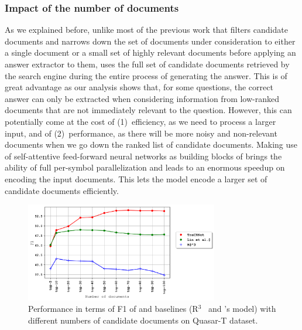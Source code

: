 \subsubsection{Impact of the number of documents}
As we explained before, unlike most of the previous work that filters candidate documents and narrows down the set of documents under consideration to either a single document or a small set of highly relevant documents before applying an answer extractor to them, \tracrnet uses the full set of candidate documents retrieved by the search engine during the entire process of generating the answer. 
This is of great advantage as our analysis shows that, for some questions, the correct answer can only be extracted when considering information from low-ranked documents that are not immediately relevant to the question.
However, this can potentially come at the cost of (1)~efficiency, as we need to process a larger input, and of (2)~performance, as there will be more noisy and non-relevant documents when we go down the ranked list of candidate documents. 
%
Making use of self-attentive feed-forward neural networks as building blocks of \tracrnet brings the ability of full per-symbol parallelization and leads to an enormous speedup on encoding the input documents. This lets the model encode a larger set of candidate documents efficiently. 

\begin{figure}[!t]
 \centering
 \includegraphics[width=0.75\textwidth]{04-part-03/chapter-06/figs_and_tables/plot_different_num_docs.png}
 \caption{Performance in terms of F1 of \tracrnet and baselines (R$^3$~\citep{wang2017r} and \citet{lin2018denoising}'s model) with different numbers of candidate documents on Quasar-T dataset.}
 \label{fig:diff_num_docs}
\end{figure}

